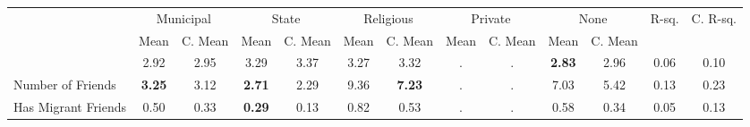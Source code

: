 \begin{tabular}{l c c c c c c c c c c c c}
\toprule
& \multicolumn{2}{c}{Municipal} & \multicolumn{2}{c}{State} & \multicolumn{2}{c}{Religious} & \multicolumn{2}{c}{Private} & \multicolumn{2}{c}{None} & R-sq. & C. R-sq. \\
& \scriptsize Mean & \scriptsize C. Mean & \scriptsize Mean & \scriptsize C. Mean & \scriptsize Mean & \scriptsize C. Mean & \scriptsize Mean & \scriptsize C. Mean & \scriptsize Mean & \scriptsize C. Mean & & \\
\midrule
&      2.92 & 2.95 &      3.29 & 3.37 &      3.27 & 3.32 &         . & . & \textbf{     2.83} & 2.96 &      0.06 &      0.10 \\
Number of Friends & \textbf{     3.25} & 3.12 & \textbf{     2.71} & 2.29 &      9.36 & \textbf{     7.23} &         . & . &      7.03 & 5.42 &      0.13 &      0.23 \\
Has Migrant Friends &      0.50 & 0.33 & \textbf{     0.29} & 0.13 &      0.82 & 0.53 &         . & . &      0.58 & 0.34 &      0.05 &      0.13 \\
\bottomrule
\end{tabular}
